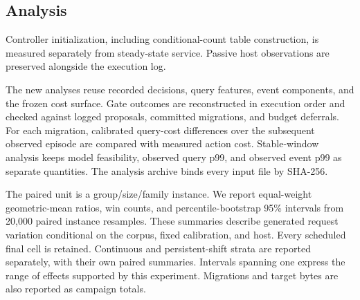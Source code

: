 \subsection{Analysis}
Controller initialization, including conditional-count table construction, is measured separately from steady-state service. Passive host observations are preserved alongside the execution log.

The new analyses reuse recorded decisions, query features, event components, and the frozen cost surface. Gate outcomes are reconstructed in execution order and checked against logged proposals, committed migrations, and budget deferrals. For each migration, calibrated query-cost differences over the subsequent observed episode are compared with measured action cost. Stable-window analysis keeps model feasibility, observed query p99, and observed event p99 as separate quantities. The analysis archive binds every input file by SHA-256.

The paired unit is a group/size/family instance. We report equal-weight geometric-mean ratios, win counts, and percentile-bootstrap 95\% intervals from 20,000 paired instance resamples. These summaries describe generated request variation conditional on the corpus, fixed calibration, and host. Every scheduled final cell is retained. Continuous and persistent-shift strata are reported separately, with their own paired summaries. Intervals spanning one express the range of effects supported by this experiment. Migrations and target bytes are also reported as campaign totals.
